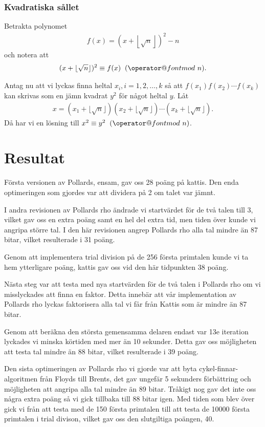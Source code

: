 \documentclass[a4paper,12pt]{article}
\makeatletter
\def\imod#1{\allowbreak\mkern10mu({\operator@font mod}\,\,#1)}
\renewcommand{\*}{\ensuremath{\cdot}}
\makeatother
\begin{document}
\subsubsection{Kvadratiska sållet}

Betrakta polynomet 
\begin{align*}
    f(x) = (x + \left\lfloor \sqrt{n} \right\rfloor)^2 - n
\end{align*}
och notera att
\begin{align*}
    (x + \lfloor \sqrt{n} \rfloor)^2 \equiv f(x) \imod{n}.
\end{align*}

Antag nu att vi lyckas finna heltal $x_i, i = 1, 2, \dots, k$ så att
$f(x_1)f(x_2)\cdots f(x_k)$ kan skrivas som en jämn kvadrat $y^2$ för något
heltal $y$. Låt 
\begin{align*}
    x = (x_1 + \lfloor \sqrt{n} \rfloor) (x_2 + \lfloor \sqrt{n} \rfloor)\cdots
    (x_k + \lfloor \sqrt{n} \rfloor).
\end{align*}
Då har vi en lösning till $x^2 \equiv y^2 \imod{n}$.







\section{Resultat}

Första versionen av Pollards, ensam, gav oss 28 poäng på kattis. Den enda optimeringen som gjordes var att dividera på 2 om talet var jämnt.

I andra revisionen av Pollards rho ändrade vi startvärdet för de två talen till 3, vilket gav oss en extra poäng samt en hel del extra tid, men tiden över kunde vi angripa större tal. I den här revisionen angrep Pollards rho alla tal mindre än 87 bitar, vilket resulterade i 31 poäng.

Genom att implementera trial division på de 256 första primtalen kunde vi ta hem ytterligare poäng, kattis gav oss vid den här tidpunkten 38 poäng.

Nästa steg var att testa med nya startvärden för de två talen i Pollards rho om vi misslyckades att finna en faktor. Detta innebär att vår implementation av Pollards rho lyckas faktorisera alla tal vi får från Kattis som är mindre än 87 bitar.

Genom att beräkna den största gemensamma delaren endast var 13e iteration lyckades vi minska körtiden med mer än 10 sekunder. Detta gav oss möjligheten att testa tal mindre än 88 bitar, vilket resulterade i 39 poäng.

Den sista optimeringen av Pollards rho vi gjorde var att byta cykel-finnar-algoritmen från Floyds till Brents, det gav ungefär 5 sekunders förbättring och möjligheten att angripa alla tal mindre än 89 bitar. Tråkigt nog gav det inte oss några extra poäng så vi gick tillbaka till 88 bitar igen. Med tiden som blev över gick vi från att testa med de 150 första primtalen till att testa de 10000 första primtalen i trial divison, vilket gav oss den slutgiltiga poängen, 40.
\end{document}
